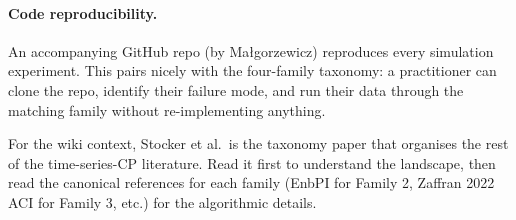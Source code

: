 \documentclass[letterpaper,11pt,leqno]{article}
\newcommand{\bib}{paper.bib}
\begin{document}
\paragraph{Code reproducibility.} An accompanying GitHub repo (by Ma\l{}gorzewicz) reproduces every simulation experiment. This pairs nicely with the four-family taxonomy: a practitioner can clone the repo, identify their failure mode, and run their data through the matching family without re-implementing anything.

For the wiki context, Stocker et al.\ is the taxonomy paper that organises the rest of the time-series-CP literature. Read it first to understand the landscape, then read the canonical references for each family (EnbPI for Family 2, Zaffran 2022 ACI for Family 3, etc.) for the algorithmic details.


\end{document}
